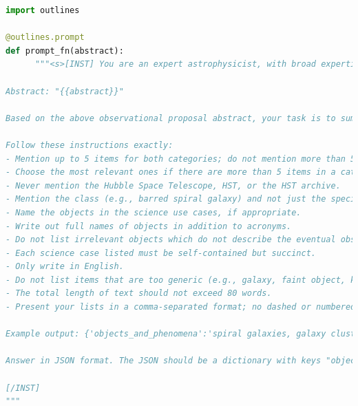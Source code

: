 \documentclass[10pt]{article} %
\begin{document}
\begin{lstlisting}[language=Python]
import outlines 

@outlines.prompt
def prompt_fn(abstract):
      """<s>[INST] You are an expert astrophysicist, with broad expertise across observational and theoretical astrophysics. You are able to extract core information from astrophysical texts.

Abstract: "{{abstract}}"

Based on the above observational proposal abstract, your task is to summarize the nature of the eventual observations. You will identify the astrophysical objects and phenomena, as well as the potential science use cases described in the abstract.

Follow these instructions exactly:
- Mention up to 5 items for both categories; do not mention more than 5 items in either category. 
- Choose the most relevant ones if there are more than 5 items in a category.
- Never mention the Hubble Space Telescope, HST, or the HST archive.
- Mention the class (e.g., barred spiral galaxy) and not just the specific instance (e.g., Andromeda).
- Name the objects in the science use cases, if appropriate.
- Write out full names of objects in addition to acronyms.
- Do not list irrelevant objects which do not describe the eventual observation, such as units or proposal Cycle numbers. List fewer but more relevant objects, if in doubt.
- Each science case listed must be self-contained but succinct.
- Only write in English.
- Do not list items that are too generic (e.g., galaxy, faint object, kinematics)
- The total length of text should not exceed 80 words.
- Present your lists in a comma-separated format; no dashed or numbered lists.

Example output: {'objects_and_phenomena':'spiral galaxies, galaxy clusters, supernova remnants', 'science_use_cases':'model galactic structure and evolution, characterize dark matter distribution in clusters, analyze expansion rates of supernova remnants'}

Answer in JSON format. The JSON should be a dictionary with keys "objects_and_phenomena" and "science_use_cases".

[/INST]
"""
\end{lstlisting}

\end{document}
